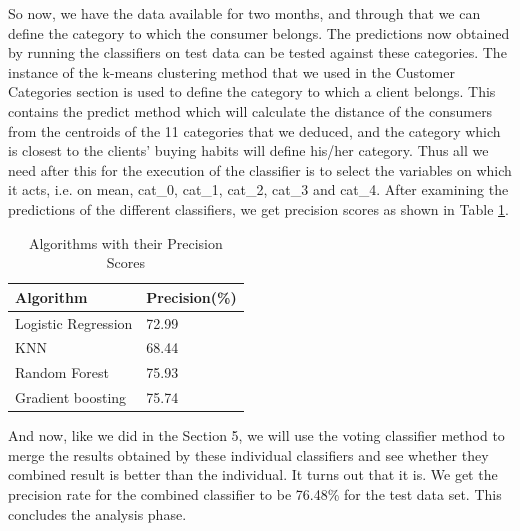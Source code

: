 So now, we have the data available for two months, and through that we can define the category to which the consumer belongs. The predictions now obtained by running the classifiers on test data can be tested against these categories. The instance of the k-means clustering method that we used in the Customer Categories section is used to define the category to which a client belongs. This contains the predict method which will calculate the distance of the consumers from the centroids of the 11 categories that we deduced, and the category which is closest to the clients' buying habits will define his/her category. Thus all we need after this for the execution of the classifier is to select the variables on which it acts, i.e. on mean, cat\_0, cat\_1, cat\_2, cat\_3 and cat\_4. After examining the predictions of the different classifiers, we get precision scores as shown in Table \ref{t:precisionscore}.\\ 

\begin{table}[htb]
\centering
\caption{Algorithms with their Precision Scores}
\label{t:precisionscore}
\begin{tabular}{ll}
Algorithm & Precision(\%) \\
\hline
Logistic Regression & 72.99 \\
KNN & 68.44 \\
Random Forest & 75.93 \\
Gradient boosting & 75.74

\end{tabular}
\end{table}

And now, like we did in the Section 5, we will use the voting classifier method to merge the results obtained by these individual classifiers and see whether they combined result is better than the individual. It turns out that it is. We get the precision rate for the combined classifier to be 76.48\% for the test data set. This concludes the analysis phase.\\

